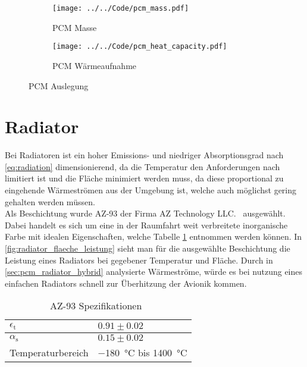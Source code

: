 \begin{figure}[H]
    \centering
    \begin{subfigure}{0.9\textwidth}
        \centering
        \texttt{[image: ../../Code/pcm\_mass.pdf]}
        \caption{PCM Masse}\label{fig:pcm_mass}
    \end{subfigure}
    \vspace{1em}  %
    \begin{subfigure}{0.9\textwidth}
        \centering
        \texttt{[image: ../../Code/pcm\_heat\_capacity.pdf]}
        \caption{PCM Wärmeaufnahme}\label{fig:pcm_heat}
    \end{subfigure}
    \caption{PCM Auslegung}\label{fig:pcm_mass_heat}
\end{figure}

\newpage

\section{Radiator}\label{sec:Radiator}

Bei Radiatoren ist ein hoher Emissions- und niedriger Absorptionsgrad nach \ref{eq:radiation} dimensionierend, da die Temperatur den Anforderungen nach limitiert ist
und die Fläche minimiert werden muss, da diese proportional zu eingehende Wärmeströmen aus der Umgebung ist, welche auch möglichst gering gehalten werden müssen.\\
Als Beschichtung wurde AZ-93 der Firma AZ Technology LLC.~\cite{AZ-Technology} ausgewählt. Dabei handelt es sich um eine in der Raumfahrt
weit verbreitete inorganische Farbe mit idealen Eigenschaften, welche Tabelle \ref{tab:az-93_eigenschaften} entnommen werden können.
In \ref{fig:radiator_flaeche_leistung} sieht man für die ausgewählte Beschichtung die Leistung eines Radiators bei gegebener Temperatur und Fläche.
Durch in \ref{sec:pcm_radiator_hybrid} analysierte Wärmeströme, würde es bei nutzung eines einfachen Radiators schnell zur Überhitzung der Avionik kommen.\\


\begin{table}[H]

  \centering
  \caption{AZ-93 Spezifikationen~\cite{AZ-Technology}}\label{tab:az-93_eigenschaften}

  \begin{tabular}{ll}

    \toprule[1pt]
    $\epsilon_{\text{t}}$ & $0.91 \pm 0.02$ \\

    \midrule[0.5pt]
    $\alpha_{\text{s}}$ & $0.15 \pm 0.02$ \\

    \midrule[0.5pt]
    Temperaturbereich  & \SI{-180}{\degreeCelsius} bis \SI{1400}{\degreeCelsius} \\

    \bottomrule[1pt]
  \end{tabular}
\end{table}

